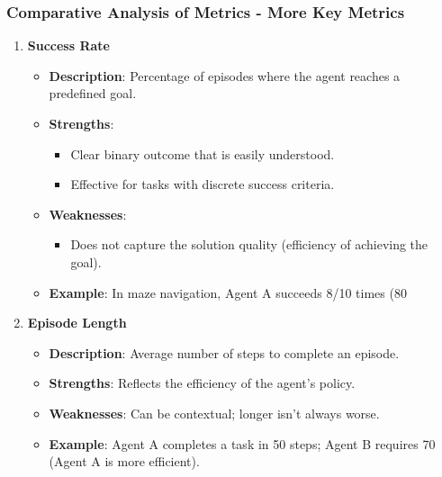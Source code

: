 \documentclass{beamer}
\begin{document}
\begin{frame}[fragile]
    \frametitle{Comparative Analysis of Metrics - More Key Metrics}
    \begin{enumerate}[resume]
        \item \textbf{Success Rate}
            \begin{itemize}
                \item \textbf{Description}: Percentage of episodes where the agent reaches a predefined goal.
                \item \textbf{Strengths}: 
                    \begin{itemize}
                        \item Clear binary outcome that is easily understood.
                        \item Effective for tasks with discrete success criteria.
                    \end{itemize}
                \item \textbf{Weaknesses}: 
                    \begin{itemize}
                        \item Does not capture the solution quality (efficiency of achieving the goal).
                    \end{itemize}
                \item \textbf{Example}: In maze navigation, Agent A succeeds 8/10 times (80%
            \end{itemize}
        
        \item \textbf{Episode Length}
            \begin{itemize}
                \item \textbf{Description}: Average number of steps to complete an episode.
                \item \textbf{Strengths}: Reflects the efficiency of the agent’s policy.
                \item \textbf{Weaknesses}: Can be contextual; longer isn't always worse.
                \item \textbf{Example}: Agent A completes a task in 50 steps; Agent B requires 70 (Agent A is more efficient).
            \end{itemize}
        

\end{enumerate}
\end{frame}
\end{document}
